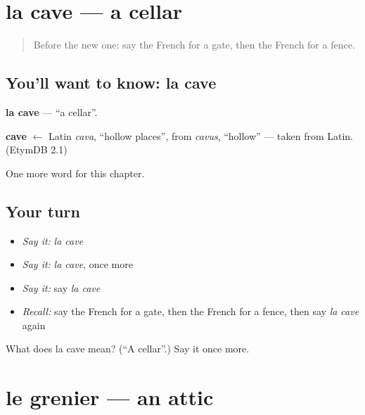 \section[la cave]{la cave — a cellar}

\label{lesson:FR-C200-cave}



\begin{quote}
Before the new one: say the French for a gate, then the French for a fence.
\end{quote}

\subsection*{You'll want to know: la cave}
\textbf{la cave} — \textquotedblleft{}a cellar\textquotedblright{}.

\begin{cousinweb}
\textbf{cave} $\leftarrow$ Latin \emph{cava}, \textquotedblleft{}hollow places\textquotedblright{}, from \emph{cavus}, \textquotedblleft{}hollow\textquotedblright{} — taken from Latin. (EtymDB 2.1)
\end{cousinweb}

\begin{grammarlens}[title={What you've built}]
One more word for this chapter.
\end{grammarlens}

\subsection*{Your turn}
\begin{itemize}
\raggedright
  \item \emph{Say it:} \emph{la cave}
  \item \emph{Say it:} \emph{la cave}, once more
  \item \emph{Say it:} say \emph{la cave}
  \item \emph{Recall:} say the French for a gate, then the French for a fence, then say \emph{la cave} again
\end{itemize}

\begin{tcolorbox}[breakable,colback=teal!4,colframe=teal!35!black,title={Before you move on}]
What does la cave mean? (\textquotedblleft{}A cellar\textquotedblright{}.) Say it once more.
\end{tcolorbox}
\section[le grenier]{le grenier — an attic}

